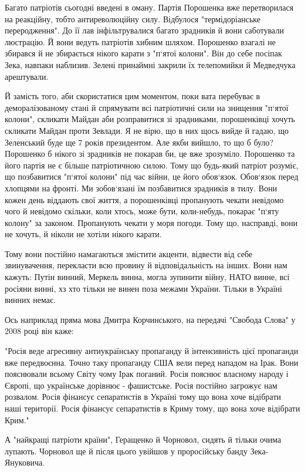 \begin{itemize}
\begin{itemize}
Багато патріотів сьогодні введені в оману. Партія Порошенка вже перетворилася
на реакційну, тобто антиреволюційну силу. Відбулося "термідоріанське
переродження". До її лав інфільтрувалися багато зрадників й вони саботували
люстрацію. Й вони ведуть патріотів хибним шляхом. Порошенко взагалі не збирався
й не збирається нікого карати з "п`ятої колони". Він до себе посіпак Зека,
навпаки наблизив. Зелені принаймні закрили їх телепомийки й Медведчука
арештували.

Й замість того, аби скористатися цим моментом, поки вата перебуває в
деморалізованому стані й спрямувати всі патріотичні сили на знищення "п`ятої
колони", скликати Майдан аби розправитися зі зрадниками, порошенківці хочуть
скликати Майдан проти Зевлади. Я не вірю, що в них щось вийде й гадаю, що
Зеленський буде ще 7 років президентом. Але якби вийшло, то що б було?
Порошенко б нікого зі зрадників не покарав би, це вже зрозуміло. Порошенко та
його партія не є більше патріотичною силою. Тому що будь-який патріот розуміє,
що позбавитися "п`ятої колони" під час війни, це його обов`язок. Обов`язок
перед хлопцями на фронті. Ми зобов`язані їм позбавитися зрадників в тилу. Вони
кожен день віддають свої життя, а порошенківці пропанують чекати невідомо чого
й невідомо скільки, коли хтось, може бути, коли-небудь, покарає "п`яту колону"
за законом. Пропанують чекати у моря погоди. Тому що, насправді, вони не
хочуть, й ніколи не хотіли нікого карати.

Тому вони постійно намагаються змістити акценти, відвести від себе
звинувачення, перекласти всю провину й відповідальність на інших. Вони нам
кажуть: Путін винний, Меркель винна, могла зупинити війну, НАТО винне, всі
росіяни винні, хз хто тільки не винен поза межами України. Тільки в Україні
винних немає.

Ось наприклад пряма мова Дмитра Корчинського, на передачі "Свобода Слова" у
2008 році він каже:

"Росія веде агресивну антиукраїнську пропаганду й інтенсивність цієї пропаганди
вже передвоєнна. Точно таку пропаганду США вели перед нападом на Ірак. Вони
пояснювали всьому Світу чому Ірак поганий. Росія пояснює власному народу і
Європі, що українське дорівнює - фашистське. Росія постійно загрожує нам
розвалом. Росія фінансує сепаратистів в Україні тому що вона хоче відібрати
наші території. Росія фінансує сепаратистів в Криму тому, що вона хоче
відібрати Крим."

А "найкращі патріоти країни", Геращенко й Чорновол, сидять й тільки очима
лупають. Чорновол ще й після цього увійшов у проросійську банду Зека-Януковича.


\end{itemize}
\end{itemize}
